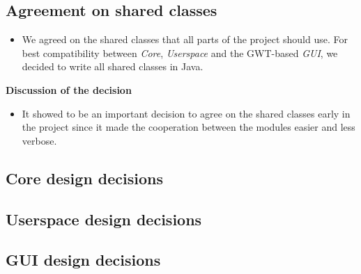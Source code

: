 \subsection{Agreement on shared classes}

\begin{itemize}
	\item We agreed on the shared classes that all parts of the project should use. For best compatibility between  \emph{Core}, \emph{Userspace} and the GWT-based \emph{GUI}, we decided to write all shared classes in Java.
\end{itemize}


\noindent\textbf{Discussion of the decision}

\begin{itemize}
	\item It showed to be an important decision to agree on the shared classes early in the project since it made the cooperation between the modules easier and less verbose.
\end{itemize}


\subsection{Core design decisions}



\subsection{Userspace design decisions}



\subsection{GUI design decisions}




